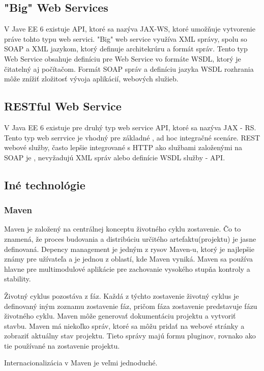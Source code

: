 \subsection{"Big" Web Services}
V Jave EE 6 existuje API, ktoré sa nazýva JAX-WS, ktoré umožňuje vytvorenie práve tohto typu web servici.\cite{fitWeb} "Big" web service využíva XML správy, spolu so SOAP a XML jazykom, ktorý definuje architekrúru a formát správ. Tento typ Web Service obsahuje definíciu pre Web Service vo formáte WSDL, ktorý je čitatelný aj počítačom. Formát SOAP správ a definíciu jazyka WSDL rozhrania môže znížiť zložitosť vývoja aplikácií, webových služieb. 

\subsection{RESTful Web Service}
V Java EE 6 existuje pre druhý typ web service API, ktoré sa nazýva JAX - RS. Tento typ web serrvice je vhodný pre základné , ad hoc integračné scenáre. REST webové služby, často lepšie integrované s HTTP ako službami založenými na SOAP je , nevyžadujú XML správ alebo definície WSDL služby - API.


\subsection{Iné technológie}
\subsubsection{Maven}
Maven  je založený na centrálnej konceptu životného cyklu zostavenie. Čo to znamená, že proces budovania a distribúciu určitého artefaktu(projektu) je jasne definovaná. Depency management je jedným z rysov Maven-u, ktorý je najlepšie známy pre užívateľa a je jednou z oblastí, kde Maven vyniká. Maven sa používa hlavne pre multimodulové aplikácie pre zachovanie vysokého stupňa kontroly a stability.

Životný cyklus pozostáva z fáz. Každá z týchto zostavenie životný cyklus je definovaný iným zoznamu zostavenie fáz, pričom fáza zostavenie predstavuje fázu životného cyklu. Maven môže generovať dokumentáciu projektu a  vytvoriť stavbu. Maven má niekoľko správ, ktoré sa môžu pridať na webové stránky a zobraziť aktuálny stav projektu. Tieto správy majú formu pluginov, rovnako ako tie používané na zostavenie projektu.

Internacionalizácia v Maven je veľmi jednoduché.\cite{mavenbook}

